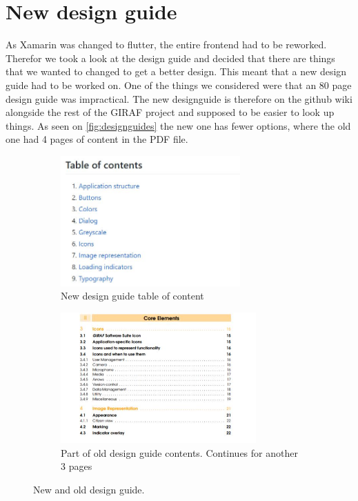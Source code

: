 \section{New design guide}
As Xamarin was changed to flutter, the entire frontend had to be reworked. 
Therefor we took a look at the design guide and decided that there are things that we wanted to changed to get a better design.
This meant that a new design guide had to be worked on.
One of the things we considered were that an 80 page design guide was impractical. 
The new designguide is therefore on the github wiki alongside the rest of the GIRAF project and supposed to be easier to look up things.
As seen on \autoref{fig:designguides} the new one has fewer options, where the old one had 4 pages of content in the PDF file.
\begin{figure}[H]
    \begin{subfigure}{0.6\textwidth}
    \includegraphics[width=1\linewidth, height=5cm]{figures/table-of-content-designguide.JPG}
    \caption{New design guide table of content}
    \label{fig:new-designguide}
    \end{subfigure}
    \begin{subfigure}{0.6\textwidth}
        \includegraphics[width=1\linewidth, height=5cm]{figures/old-design-guide}
    \caption{Part of old design guide contents. Continues for another 3 pages}
    \label{fig:old-designguide}
    \end{subfigure} 
    \caption{New and old design guide.}
    \label{fig:designguides}
\end{figure} 

